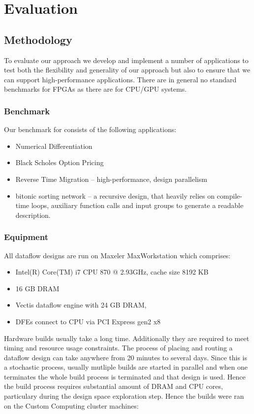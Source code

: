 \chapter{Evaluation}
\label{sec:evaluation}

\section{Methodology}

To evaluate our approach we develop and implement a number of applications
to test both the flexibility and generality of our approach but also to
ensure that we can support high-performance applications. There are in general
no standard benchmarks for FPGAs as there are for CPU/GPU systems.

\subsection{Benchmark}
\label{sec:benchmark}
Our benchmark for consists of the following applications:
\begin{itemize}
\item Numerical Differentiation
\item Black Scholes Option Pricing
\item Reverse Time Migration -- high-performance, design parallelism
\item bitonic sorting network -- a recursive design, that heavily
relies on compile-time loops, auxiliary function calls and input
groups to generate a readable description.
\end{itemize}

\subsection{Equipment}

All dataflow designs are run on Maxeler MaxWorkstation
\cite{MaxWorkstation} which comprises:
\begin{itemize}
\item Intel(R) Core(TM) i7 CPU 870 @ 2.93GHz, cache size 8192 KB
\item 16 GB DRAM
\item Vectis dataflow engine with 24 GB DRAM,
\item DFEs connect to CPU via PCI Express gen2 x8
\end{itemize}

Hardware builds usually take a long time. Additionally they are
required to meet timing and resource usage constraints. The process of
placing and routing a dataflow design can take anywhere from 20
minutes to several days. Since this is a stochastic process, usually
mutliple builds are started in parallel and when one terminates the
whole build process is terminated and that design is used. Hence the
build process requires substantial amount of DRAM and CPU cores,
particulary during the design space exploration step. Hence the builds
were ran on the Custom Computing cluster machines:

